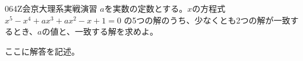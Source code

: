 \begin{thm}{064}{}{Z会京大理系実戦演習}
 $a$を実数の定数とする。$x$の方程式 $x^5-x^4+ax^3+ax^2-x+1=0$ の5つの解のうち、少なくとも2つの解が一致するとき、$a$の値と、一致する解を求めよ。
\end{thm}

ここに解答を記述。